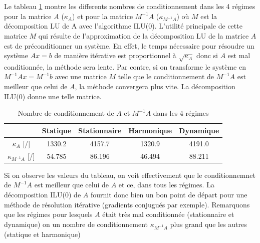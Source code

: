 \documentclass[11pt]{article}
\begin{document}
Le tableau \ref{condcomp} montre les differents nombres de conditionnement dans les 4 régimes pour la matrice $A$ ($\kappa_A$) et pour la matrice $M^{-1}A$ ($\kappa_{M^{-1}A}$) où $M$ est la décomposition LU de A avec l'algorithme ILU(0). L'utilité principale de cette matrice $M$ qui résulte de l'approximation de la décomposition LU de la matrice $A$ est de préconditionner un système. En effet, le temps nécessaire pour résoudre un système $Ax = b$ de manière itérative est proportionnel à $\sqrt{\kappa_A}$ donc si $A$ est mal conditionnée, la méthode sera lente. Par contre, si on transforme le système en $M^{-1}A x = M^{-1}b$ avec une matrice $M$ telle que le conditionnement de $M^{-1}A$ est meilleur que celui de $A$, la méthode convergera plus vite. La décomposition ILU(0) donne une telle matrice. \\
\begin{table}[h!]
    \centering
    \begin{tabular}{|c|c|c|c|c|}
        \hline
         & Statique & Stationnaire & Harmonique & Dynamique \\
         \hline
         $\kappa_A$ [/] & 1330.2 & 4157.7 & 1320.9 & 4191.0 \\
         \hline
        $\kappa_{M^{-1}A}$ [/] & 54.785 & 86.196 & 46.494 & 88.211 \\
         \hline
    \end{tabular}
    \caption{Nombre de conditionnement de $A$ et $M^{-1}A$ dans les 4 régimes}
    \label{condcomp}
\end{table}
Si on observe les valeurs du tableau, on voit effectivement que le conditionnemnet de $M^{-1}A$ est meilleur que celui de $A$ et ce, dans tous les régimes. La décomposition ILU(0) de $A$ fournit donc bien un bon point de départ pour une méthode de résolution itérative (gradients conjugués par exemple). Remarquons que les régimes pour lesquels $A$  était très mal conditionnée (stationnaire et dynamique) on un nombre de conditionnement $\kappa_{M^{-1}A}$ plus grand que les autres (statique et harmonique)
\end{document}
